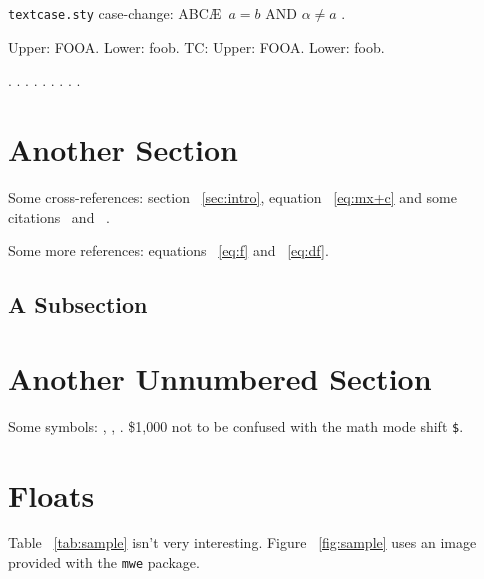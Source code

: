 \documentclass{article}
\begin{document}
\texttt{textcase.sty} case-change: \MakeTextUppercase{abc\ae\ \( a = b \) and $\alpha \neq a$ }. 


\newcommand{\foo}{fooa} 
\newcommand{\FOO}{foob} Upper: \uppercase{\foo}. Lower: \lowercase{\FOO}. TC: Upper: \MakeTextUppercase{\foo}. Lower: \MakeTextLowercase{\FOO}. 

. . . . . . . . . 


\section{Another Section} 

Some cross-references: section~
\ref{sec:intro}, equation~
\ref{eq:mx+c} and some citations~
\cite{article-full,incollection-full} and~
\cite[some text]{inproceedings-full}. 

Some more references: equations~
\ref{eq:f} and~
\ref{eq:df}. 

\lipsum[2-3] 

\subsection{A Subsection} 

\lipsum[6-7] 


\section*{Another Unnumbered Section} 

Some symbols: , , . \$1,000 not to be confused with the math mode shift \verb|$|. 

\lipsum[8-9] 


\section{Floats} 
\label{sec:floats} 

Table~
\ref{tab:sample} isn't very interesting. Figure~
\ref{fig:sample} uses an image provided with the \texttt{mwe} package. 
\end{document}
